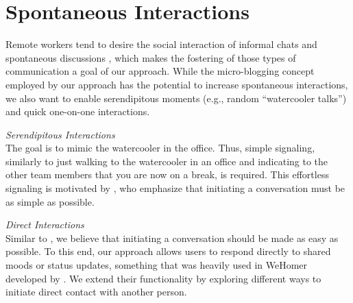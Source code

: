\section{Spontaneous Interactions}
Remote workers tend to desire the social interaction of informal chats and spontaneous discussions \autocite{cooper2002telecommuting}, which makes the fostering of those types of communication a goal of our approach. While the micro-blogging concept employed by our approach has the potential to increase spontaneous interactions, we also want to enable serendipitous moments (e.g., random \enquote{watercooler talks}) and quick one-on-one interactions. 

\medskip\noindent\textit{Serendipitous Interactions} \\
The goal is to mimic the watercooler in the office. Thus, simple signaling, similarly to just walking to the watercooler in an office and indicating to the other team members that you are now on a break, is required. This effortless signaling is motivated by \textcite{chang2007out}, who emphasize that initiating a conversation must be as simple as possible. 

\medskip\noindent\textit{Direct Interactions} \\
Similar to \textcite{chang2007out}, we believe that initiating a conversation should be made as easy as possible. To this end, our approach allows users to respond directly to shared moods or status updates, something that was heavily used in WeHomer developed by \textcite{dullemond2013fixing}. We extend their functionality by exploring different ways to initiate direct contact with another person. 

